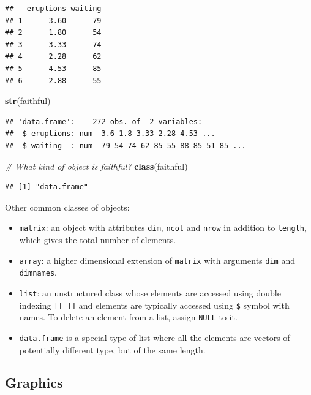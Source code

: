 \documentclass[
  11pt,
  letterpaper,
]{book}
\newenvironment{Shaded}{\begin{snugshade}}{\end{snugshade}}
\newcommand{\CommentTok}[1]{\textcolor[rgb]{0.56,0.35,0.01}{\textit{#1}}}
\newcommand{\KeywordTok}[1]{\textcolor[rgb]{0.13,0.29,0.53}{\textbf{#1}}}
\newcommand{\NormalTok}[1]{#1}
\providecommand{\tightlist}{%
  \setlength{\itemsep}{0pt}\setlength{\parskip}{0pt}}
\theoremstyle{definition}
\theoremstyle{definition}
\theoremstyle{definition}
\theoremstyle{remark}
\begin{document}
\begin{verbatim}
##   eruptions waiting
## 1      3.60      79
## 2      1.80      54
## 3      3.33      74
## 4      2.28      62
## 5      4.53      85
## 6      2.88      55
\end{verbatim}

\begin{Shaded}
\begin{Highlighting}[]
\KeywordTok{str}\NormalTok{(faithful)}
\end{Highlighting}
\end{Shaded}

\begin{verbatim}
## 'data.frame':	272 obs. of  2 variables:
##  $ eruptions: num  3.6 1.8 3.33 2.28 4.53 ...
##  $ waiting  : num  79 54 74 62 85 55 88 85 51 85 ...
\end{verbatim}

\begin{Shaded}
\begin{Highlighting}[]
\CommentTok{\# What kind of object is faithful? }
\KeywordTok{class}\NormalTok{(faithful)}
\end{Highlighting}
\end{Shaded}

\begin{verbatim}
## [1] "data.frame"
\end{verbatim}

Other common classes of objects:

\begin{itemize}
\tightlist
\item
  \texttt{matrix}: an object with attributes \texttt{dim}, \texttt{ncol} and \texttt{nrow} in addition to \texttt{length}, which gives the total number of elements.
\item
  \texttt{array}: a higher dimensional extension of \texttt{matrix} with arguments \texttt{dim} and \texttt{dimnames}.
\item
  \texttt{list}: an unstructured class whose elements are accessed using double indexing \texttt{{[}{[}\ {]}{]}} and elements are typically accessed using \texttt{\$} symbol with names. To delete an element from a list, assign \texttt{NULL} to it.
\item
  \texttt{data.frame} is a special type of list where all the elements are vectors of potentially different type, but of the same length.
\end{itemize}

\hypertarget{graphics}{%
\subsection{Graphics}\label{graphics}}
\end{document}
